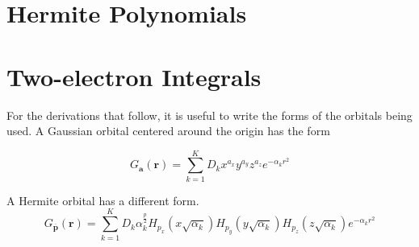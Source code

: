 \documentclass[twoside,10pt,draft]{article}
\begin{document}
\section{Hermite Polynomials}



\section{Two-electron Integrals}

For the derivations that follow, it is useful to write the forms of the orbitals being used. A Gaussian orbital centered around the origin has the form

\begin{equation}
  G_{\mathbf{a}}(\mathbf{r}) = \sum_{k = 1}^K D_k x^{a_x} y^{a_y} z^{a_z} e^{-\alpha_k r^2}
  \label{cart-orb}
\end{equation}

A Hermite orbital has a different form.
\begin{equation}
  G_{\overline{\mathbf{p}}}(\mathbf{r}) = \sum_{k = 1}^K D_k \alpha_k^{\frac{p}{2}} H_{p_x}\left(x\sqrt{\alpha_k}\right)H_{p_y}\left(y\sqrt{\alpha_k}\right)H_{p_z}\left(z\sqrt{\alpha_k}\right) e^{-\alpha_k r^2}
  \label{herm-orb}
\end{equation}



%



\end{document}
